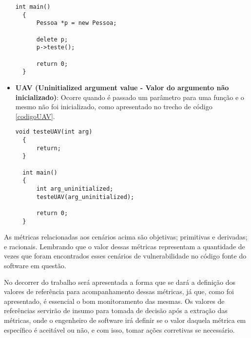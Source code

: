 \begin{itemize}
\begin{lstlisting}[caption={Código exemplo UAF}, label=codigoUAF]
  int main()
  {
      Pessoa *p = new Pessoa;

      delete p;
      p->teste();

      return 0;
  }
    \end{lstlisting}
  \item \textbf{UAV (Uninitialized argument value - Valor do argumento não inicializado)}: Ocorre quando é passado um parâmetro
    para uma função e o mesmo não foi inicializado, como apresentado no trecho de código \ref{codigoUAV}.

    \begin{lstlisting}[caption={Código exemplo UAV}, label=codigoUAV]
  void testeUAV(int arg)
  {
      return;
  }

  int main()
  {
      int arg_uninitialized;
      testeUAV(arg_uninitialized);
      
      return 0;
  }
    \end{lstlisting}
\end{itemize}

As métricas relacionadas aos cenários acima são objetivas; primitivas e derivadas; e racionais. Lembrando que o valor dessas 
métricas representam a quantidade de vezes que foram encontrados esses cenários de vulnerabilidade no código fonte do software 
em questão.

No decorrer do trabalho será apresentada a forma que se dará a definição dos valores de referência para acompanhamento dessas
métricas, já que, como foi apresentado, é essencial o bom monitoramento das mesmas. Os valores de referências servirão
de insumo para tomada de decisão após a extração das métricas, onde o engenheiro de software irá definir se o valor daquela
métrica em específico é aceitável ou não, e com isso, tomar ações corretivas se necessário.

